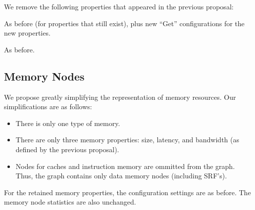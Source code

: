 
We remove the following properties that appeared in the previous
proposal: \\



As before (for properties that still exist), plus new ``Get''
configurations for the new properties.


As before.

\subsection{Memory Nodes}

We propose greatly simplifying the representation of memory resources.
Our simplifications are as follows:

\begin{itemize}

\item There is only one type of memory.

\item There are only three memory properties: size, latency, and
bandwidth (as defined by the previous proposal).

\item Nodes for caches and instruction memory are ommitted from the
graph.  Thus, the graph contains only data memory nodes (including
SRF's).

\end{itemize}

For the retained memory properties, the configuration settings are as
before.  The memory node statistics are also unchanged.

